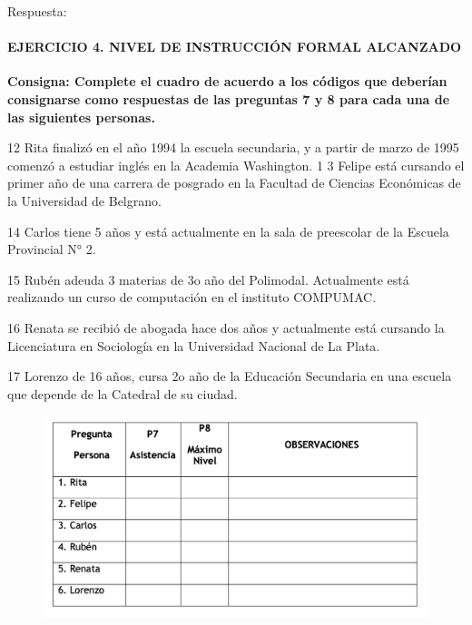 \documentclass[
  openany]{book}
\begin{document}
Respuesta:

\hypertarget{ejercicio-4.-nivel-de-instrucciuxf3n-formal-alcanzado}{%
\paragraph{\texorpdfstring{\textbf{EJERCICIO 4. NIVEL DE INSTRUCCIÓN FORMAL ALCANZADO}}{EJERCICIO 4. NIVEL DE INSTRUCCIÓN FORMAL ALCANZADO}}\label{ejercicio-4.-nivel-de-instrucciuxf3n-formal-alcanzado}}

\textbf{Consigna: Complete el cuadro de acuerdo a los códigos que deberían consignarse como respuestas de las preguntas 7 y 8 para cada una de las siguientes personas.}

12 Rita finalizó en el año 1994 la escuela secundaria, y a partir de marzo de 1995 comenzó a estudiar inglés en la Academia Washington. 1 3 Felipe está cursando el primer año de una carrera de posgrado en la Facultad de Ciencias Económicas de la Universidad de Belgrano.

14 Carlos tiene 5 años y está actualmente en la sala de preescolar de la Escuela Provincial N° 2.

15 Rubén adeuda 3 materias de 3o año del Polimodal. Actualmente está realizando un curso de computación en el instituto COMPUMAC.

16 Renata se recibió de abogada hace dos años y actualmente está cursando la Licenciatura en Sociología en la Universidad Nacional de La Plata.

17 Lorenzo de 16 años, cursa 2o año de la Educación Secundaria en una escuela que depende de la Catedral de su ciudad.

\begin{figure}

{\centering \includegraphics[width=1\linewidth]{imagenes/figura6-147} 

}

\end{figure}
\end{document}
